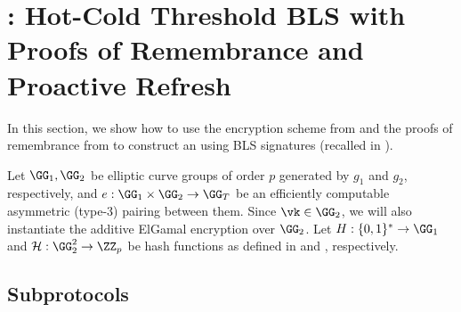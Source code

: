 \section[\sysname: Hot-Cold Threshold BLS with Proofs of Remembrance and Proactive Refresh]{\sysname: Hot-Cold Threshold BLS with\texorpdfstring{\\}{} Proofs of Remembrance and Proactive Refresh}\label{sec:bls-construction}

% 
In this section, we show how to use the encryption scheme from  and the proofs of remembrance from  to construct an \hcwl using BLS signatures (recalled in ). 

Let $\GG_1, \GG_2$ be elliptic curve groups of order $p$ generated by $g_1$ and $g_2$, respectively, and $e: \GG_1 \times \GG_2 \rightarrow \GG_T$ be an efficiently computable asymmetric (type-3) pairing between them. 
Since $\vk \in \GG_2$, we will also instantiate the additive ElGamal encryption over $\GG_2$. 
Let $\blshash: \{0, 1\}^* \rightarrow \GG_1$ and $\lhlhash: \GG_2^2 \rightarrow \ZZ_p$ be hash functions as defined in  and , respectively.

\subsection{Subprotocols}




